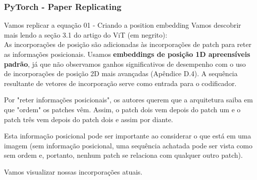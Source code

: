 \documentclass{beamer}
\begin{document}
\begin{frame}
	\frametitle{PyTorch - Paper Replicating}
	\begin{block}{Vamos replicar a equação 01 - Criando a position embedding}
	Vamos descobrir mais lendo a seção 3.1 do artigo do ViT (em negrito): \\
	As incorporações de posição são adicionadas às incorporações de patch para reter as informações posicionais. Usamos\textbf{ embeddings de posição 1D apreensíveis padrão}, já que não observamos ganhos significativos de desempenho com o uso de incorporações de posição 2D mais avançadas (Apêndice D.4). A sequência resultante de vetores de incorporação serve como entrada para o codificador.
	
	Por "reter informações posicionais", os autores querem que a arquitetura saiba em que "ordem" os patches vêm. Assim, o patch dois vem depois do patch um e o patch três vem depois do patch dois e assim por diante.
	
	Esta informação posicional pode ser importante ao considerar o que está em uma imagem (sem informação posicional, uma sequência achatada pode ser vista como sem ordem e, portanto, nenhum patch se relaciona com qualquer outro patch).
	
	Vamos visualizar nossas incorporações atuais.
	\end{block}
\end{frame}
\end{document}
